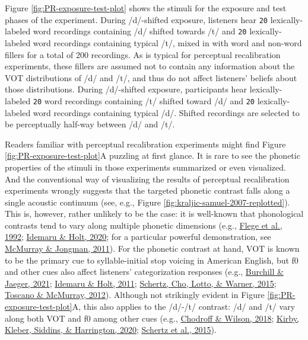 \documentclass[
  11pt,
  english,
  man,floatsintext]{apa6}
\begin{document}
Figure \ref{fig:PR-exposure-test-plot} shows the stimuli for the exposure and test phases of the experiment. During /d/-shifted exposure, listeners hear \texttt{20} lexically-labeled word recordings containing /d/ shifted towards /t/ and \texttt{20} lexically-labeled word recordings containing typical /t/, mixed in with word and non-word fillers for a total of 200 recordings. As is typical for perceptual recalibration experiments, these fillers are assumed not to contain any information about the VOT distributions of /d/ and /t/, and thus do not affect listeners' beliefs about those distributions. During /d/-shifted exposure, participants hear lexically-labeled \texttt{20} word recordings containing /t/ shifted toward /d/ and \texttt{20} lexically-labeled word recordings containing typical /d/. Shifted recordings are selected to be perceptually half-way between /d/ and /t/.

Readers familiar with perceptual recalibration experiments might find Figure \ref{fig:PR-exposure-test-plot}A puzzling at first glance. It is rare to see the phonetic properties of the stimuli in those experiments summarized or even visualized. And the conventional way of visualizing the results of perceptual recalibration experiments wrongly suggests that the targeted phonetic contrast falls along a single acoustic continuum (see, e.g., Figure \ref{fig:kraljic-samuel-2007-replotted}). This is, however, rather unlikely to be the case: it is well-known that phonological contrasts tend to vary along multiple phonetic dimensions (e.g., \protect\hyperlink{ref-flege1992}{Flege et al., 1992}; \protect\hyperlink{ref-idemaru-holt2020}{Idemaru \& Holt, 2020}; for a particular powerful demonstration, see \protect\hyperlink{ref-mcmurray-jongman2011}{McMurray \& Jongman, 2011}). For the phonetic contrast at hand, VOT is known to be the primary cue to syllable-initial stop voicing in American English, but f0 and other cues also affect listeners' categorization responses (e.g., \protect\hyperlink{ref-burchill-jaeger2022}{Burchill \& Jaeger, 2021}; \protect\hyperlink{ref-idemaru-holt2011}{Idemaru \& Holt, 2011}; \protect\hyperlink{ref-schertz2015}{Schertz, Cho, Lotto, \& Warner, 2015}; \protect\hyperlink{ref-toscano-mcmurray2012}{Toscano \& McMurray, 2012}).
Although not strikingly evident in Figure \ref{fig:PR-exposure-test-plot}A, this also applies to the /d/-/t/ contrast: /d/ and /t/ vary along both VOT and f0 among other cues (e.g., \protect\hyperlink{ref-chodroff-wilson2018}{Chodroff \& Wilson, 2018}; \protect\hyperlink{ref-kirby2020}{Kirby, Kleber, Siddins, \& Harrington, 2020}; \protect\hyperlink{ref-schertz2015}{Schertz et al., 2015}).\\
\end{document}
